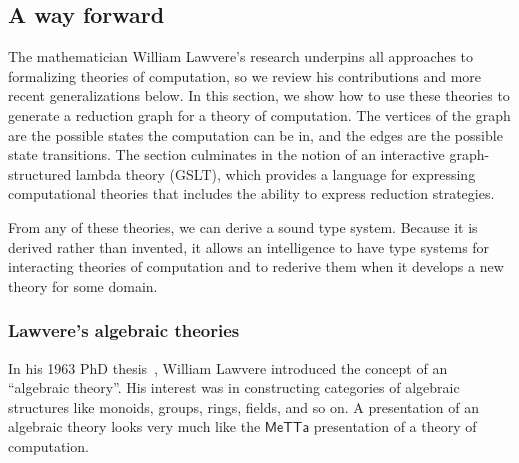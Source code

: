 \documentclass{article}
\begin{document}
\subsection{A way forward}
\label{A way forward}

The mathematician William Lawvere's research underpins all approaches to formalizing theories of computation, so we review his contributions and more recent generalizations below.  In this section, we show how to use these theories to generate a reduction graph for a theory of computation.  The vertices of the graph are the possible states the computation can be in, and the edges are the possible state transitions.  The section culminates in the notion of an interactive graph-structured lambda theory (GSLT), which provides a language for expressing computational theories that includes the ability to express reduction strategies.  

From any of these theories, we can derive a sound type system.  Because it is derived rather than invented, it allows an intelligence to have type systems for interacting theories of computation and to rederive them when it develops a new theory for some domain.

\subsubsection{Lawvere's algebraic theories}

In his 1963 PhD thesis~\cite{Lawvere1963}, William Lawvere introduced the concept of an ``algebraic theory''.  His interest was in constructing categories of algebraic structures like monoids, groups, rings, fields, and so on.  A presentation of an algebraic theory looks very much like the $\mathsf{MeTTa}$ presentation of a theory of computation.
\end{document}

